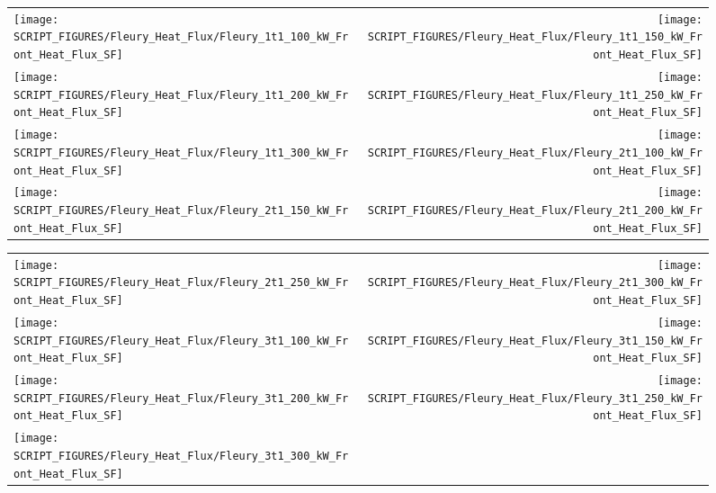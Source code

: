 \begin{figure}[p]
\begin{tabular*}{\textwidth}{l@{\extracolsep{\fill}}r}
\texttt{[image: SCRIPT\_FIGURES/Fleury\_Heat\_Flux/Fleury\_1t1\_100\_kW\_Front\_Heat\_Flux\_SF]} &
\texttt{[image: SCRIPT\_FIGURES/Fleury\_Heat\_Flux/Fleury\_1t1\_150\_kW\_Front\_Heat\_Flux\_SF]} \\
\texttt{[image: SCRIPT\_FIGURES/Fleury\_Heat\_Flux/Fleury\_1t1\_200\_kW\_Front\_Heat\_Flux\_SF]} &
\texttt{[image: SCRIPT\_FIGURES/Fleury\_Heat\_Flux/Fleury\_1t1\_250\_kW\_Front\_Heat\_Flux\_SF]} \\
\texttt{[image: SCRIPT\_FIGURES/Fleury\_Heat\_Flux/Fleury\_1t1\_300\_kW\_Front\_Heat\_Flux\_SF]} &
\texttt{[image: SCRIPT\_FIGURES/Fleury\_Heat\_Flux/Fleury\_2t1\_100\_kW\_Front\_Heat\_Flux\_SF]} \\
\texttt{[image: SCRIPT\_FIGURES/Fleury\_Heat\_Flux/Fleury\_2t1\_150\_kW\_Front\_Heat\_Flux\_SF]} &
\texttt{[image: SCRIPT\_FIGURES/Fleury\_Heat\_Flux/Fleury\_2t1\_200\_kW\_Front\_Heat\_Flux\_SF]}
\end{tabular*}
\end{figure}

\begin{figure}[p]
\begin{tabular*}{\textwidth}{l@{\extracolsep{\fill}}r}
\texttt{[image: SCRIPT\_FIGURES/Fleury\_Heat\_Flux/Fleury\_2t1\_250\_kW\_Front\_Heat\_Flux\_SF]} &
\texttt{[image: SCRIPT\_FIGURES/Fleury\_Heat\_Flux/Fleury\_2t1\_300\_kW\_Front\_Heat\_Flux\_SF]} \\
\texttt{[image: SCRIPT\_FIGURES/Fleury\_Heat\_Flux/Fleury\_3t1\_100\_kW\_Front\_Heat\_Flux\_SF]} &
\texttt{[image: SCRIPT\_FIGURES/Fleury\_Heat\_Flux/Fleury\_3t1\_150\_kW\_Front\_Heat\_Flux\_SF]} \\
\texttt{[image: SCRIPT\_FIGURES/Fleury\_Heat\_Flux/Fleury\_3t1\_200\_kW\_Front\_Heat\_Flux\_SF]} &
\texttt{[image: SCRIPT\_FIGURES/Fleury\_Heat\_Flux/Fleury\_3t1\_250\_kW\_Front\_Heat\_Flux\_SF]} \\
\texttt{[image: SCRIPT\_FIGURES/Fleury\_Heat\_Flux/Fleury\_3t1\_300\_kW\_Front\_Heat\_Flux\_SF]}
\end{tabular*}
\end{figure}

